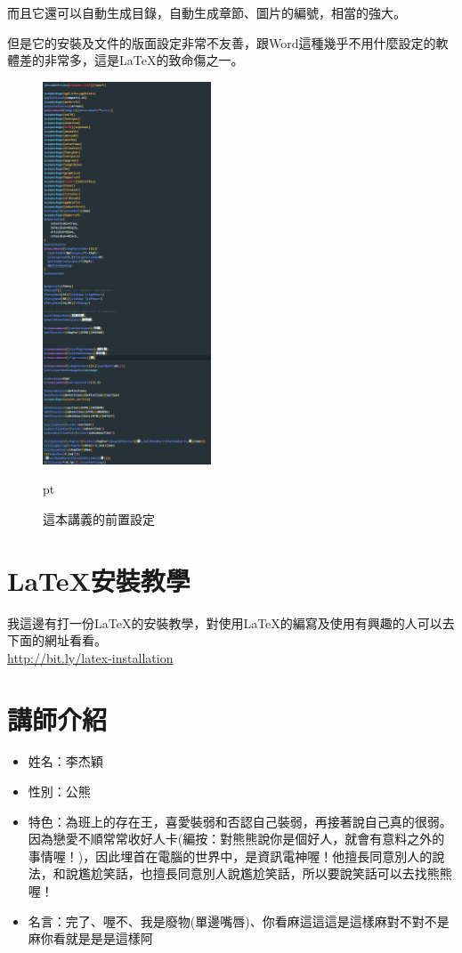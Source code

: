 而且它還可以自動生成目錄，自動生成章節、圖片的編號，相當的強大。

但是它的安裝及文件的版面設定非常不友善，跟Word這種幾乎不用什麼設定的軟體差的非常多，這是\LaTeX 的致命傷之一。

\begin{figure}[H]
    \centering
    \graphicspath{{informatics/}}
    \includegraphics[width=5cm, center]{setting.png}
    \caption{這本講義的前置設定}  pt
    \label{fig:setting}
\end{figure}

\section{\LaTeX 安裝教學}
我這邊有打一份\LaTeX 的安裝教學，對使用\LaTeX 的編寫及使用有興趣的人可以去下面的網址看看。 \\
\url{http://bit.ly/latex-installation}

\section{講師介紹}
\begin{itemize}
\item 姓名：李杰穎
\item 性別：公熊
\item 特色：為班上的存在王，喜愛裝弱和否認自己裝弱，再接著說自己真的很弱。因為戀愛不順常常收好人卡(編按：對熊熊說你是個好人，就會有意料之外的事情喔！)，因此埋首在電腦的世界中，是資訊電神喔！他擅長同意別人的說法，和說尷尬笑話，也擅長同意別人說尷尬笑話，所以要說笑話可以去找熊熊喔！
\item 名言：完了、喔不、我是廢物(單邊嘴唇)、你看麻這這這是這樣麻對不對不是麻你看就是是是這樣阿
\end{itemize}